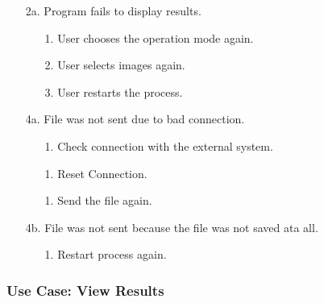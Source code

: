 \documentclass[parskip=full]{scrartcl}
\begin{document}
\begin{enumerate}
\begin{itemize} [nosep]
		\begin{itemize} [nosep]
			\item[1.] User chooses the operation mode again.
			\item[2.] User selects images again.
			\item[3.] User restarts the process.
		\end{itemize}
		\item[2a.] Program fails to display results.
		\begin{itemize} [nosep]
			\item[1.] User chooses the operation mode again.
			\item[2.] User selects images again.
			\item[3.] User restarts the process.
		\end{itemize}
		\item[4a.] File was not sent due to bad connection.
		\begin{itemize} [nosep]
			\item[1.] Check connection with the external system.
			\item[1.] Reset Connection.
			\item[1.] Send the file again.
		\end{itemize}
		\item[4b.] File was not sent because the file was not saved ata all.
		\begin{itemize} [nosep]
			\item[1.] Restart process again.
		\end{itemize}
	\end{itemize}
\end{enumerate}

\pagebreak



\subsubsection {Use Case: View Results }
\end{document}
